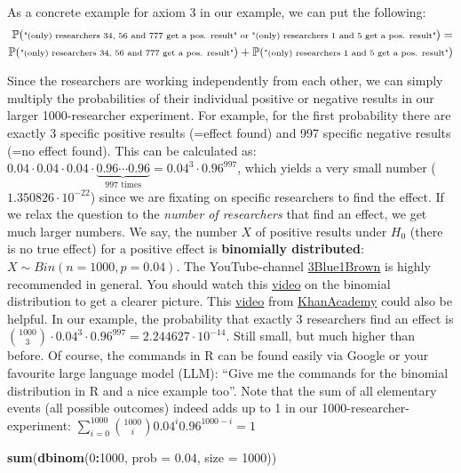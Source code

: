 \documentclass[
]{book}
\newenvironment{Shaded}{\begin{snugshade}}{\end{snugshade}}
\newcommand{\AttributeTok}[1]{\textcolor[rgb]{0.13,0.29,0.53}{#1}}
\newcommand{\DecValTok}[1]{\textcolor[rgb]{0.00,0.00,0.81}{#1}}
\newcommand{\FloatTok}[1]{\textcolor[rgb]{0.00,0.00,0.81}{#1}}
\newcommand{\FunctionTok}[1]{\textcolor[rgb]{0.13,0.29,0.53}{\textbf{#1}}}
\newcommand{\NormalTok}[1]{#1}
\newcommand{\SpecialCharTok}[1]{\textcolor[rgb]{0.81,0.36,0.00}{\textbf{#1}}}
\begin{document}
As a concrete example for axiom 3 in our example, we can put the following:
\begin{align}
\scriptsize \mathbb{P}(\text{"(only) researchers 34, 56 and 777 get a pos. result" or "(only) researchers 1 and 5 get a pos. result"}) =\\
\scriptsize \mathbb{P}(\text{"(only) researchers 34, 56 and 777 get a pos. result"}) + \mathbb{P}(\text{"(only) researchers 1 and 5 get a pos. result"})
\end{align}

Since the researchers are working independently from each other, we can simply multiply the probabilities of their individual positive or negative results in
our larger 1000-researcher experiment. For example, for the first probability there are exactly 3 specific positive
results (=effect found) and 997 specific negative results (=no effect found).
This can be calculated as:
\(0.04 \cdot 0.04 \cdot 0.04 \cdot \underbrace{0.96 \cdots 0.96}_{\text{997 times}} = 0.04^3 \cdot 0.96^{997}\), which yields a very small number (\(1.350826 \cdot 10^{-22}\))
since we are fixating on specific researchers to find the effect.
If we relax the question to the \emph{number of researchers} that find an effect,
we get much larger numbers. We say, the number \(X\) of positive results under \(H_0\) (there is no true effect) for a positive effect is \textbf{binomially distributed}: \(X \sim Bin(n=1000, p=0.04)\).
The YouTube-channel \href{https://www.youtube.com/@3blue1brown}{3Blue1Brown} is highly recommended in general. You should watch this
\href{https://www.youtube.com/watch?v=8idr1WZ1A7Q&ab_channel=3Blue1Brown}{video} on the binomial distribution to get a clearer picture.
This \href{https://www.youtube.com/watch?v=WWv0RUxDfbs&ab_channel=KhanAcademy}{video} from \href{https://www.youtube.com/@khanacademy}{KhanAcademy} could also be helpful.
In our example, the probability that exactly 3 researchers find an effect is \(\binom{1000}{3} \cdot 0.04^3 \cdot 0.96^{997} = 2.244627 \cdot 10^{-14}\).
Still small, but much higher than before. Of course, the commands in R can be found easily via Google or your favourite large language model (LLM):
``Give me the commands for the binomial distribution in R and a nice example too''.
Note that the sum of all elementary events (all possible outcomes) indeed adds up to 1 in our 1000-researcher-experiment: \(\sum_{i=0}^{1000} \binom{1000}{i}0.04^i 0.96^{1000-i} = 1\)

\begin{Shaded}
\begin{Highlighting}[]
\FunctionTok{sum}\NormalTok{(}\FunctionTok{dbinom}\NormalTok{(}\DecValTok{0}\SpecialCharTok{:}\DecValTok{1000}\NormalTok{, }\AttributeTok{prob =} \FloatTok{0.04}\NormalTok{, }\AttributeTok{size =} \DecValTok{1000}\NormalTok{))}
\end{Highlighting}
\end{Shaded}
\end{document}
